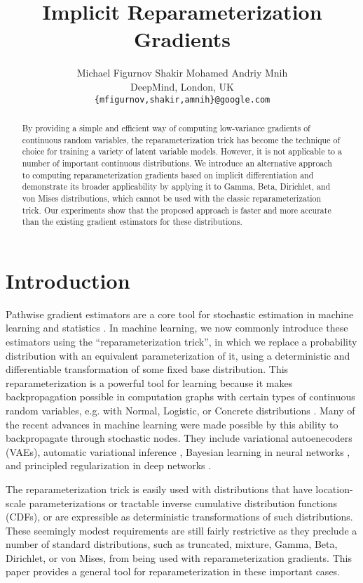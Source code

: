 \documentclass{article}
\title{Implicit Reparameterization Gradients}
\author{
  Michael Figurnov \quad Shakir Mohamed \quad Andriy Mnih\\
  DeepMind, London, UK \\
  \texttt{\{mfigurnov,shakir,amnih\}@google.com}
}
\begin{document}
\maketitle

\begin{abstract}
By providing a simple and efficient way of computing low-variance gradients of continuous random variables, the reparameterization trick has become the technique of choice for training a variety of latent variable models. However, it is not applicable to a number of important continuous distributions.  We introduce an alternative approach to computing reparameterization gradients based on implicit differentiation and demonstrate its broader applicability by applying it to Gamma, Beta, Dirichlet, and von Mises distributions, which cannot be used with the classic reparameterization trick. Our experiments show that the proposed approach is faster and more accurate than the existing gradient estimators for these distributions.
\end{abstract}

\section{Introduction}
Pathwise gradient estimators are a core tool for stochastic estimation in machine learning and statistics \cite{fu2006gradient, glasserman2013monte, titsias2014doubly, kingma2014auto, rezende2014stochastic}. In machine learning, we now commonly introduce these estimators using the ``reparameterization trick'', in which we replace a probability distribution with an equivalent parameterization of it, using a deterministic and differentiable transformation of some fixed base distribution. This reparameterization is a powerful tool for learning because it makes backpropagation possible in computation graphs with certain types of continuous random variables, e.g. with Normal, Logistic, or Concrete distributions \cite{jang2017categorical, maddison2017concrete}. Many of the recent advances in machine learning were made possible by this ability to backpropagate through stochastic nodes. They include variational autoenecoders (VAEs), automatic variational inference \cite{kingma2014auto, rezende2014stochastic, kucukelbir2017automatic}, Bayesian learning in neural networks \cite{blundell2015weight, gal2016dropout}, and principled regularization in deep networks \cite{gal2016theoretically, molchanov2017variational}.

The reparameterization trick is easily used with distributions that have location-scale parameterizations or tractable inverse cumulative distribution functions (CDFs), or are expressible as deterministic transformations of such distributions.
These seemingly modest requirements are still fairly restrictive as they preclude a number of standard distributions, such as truncated, mixture, Gamma, Beta, Dirichlet, or von Mises, from being used with reparameterization gradients. This paper provides a general tool for reparameterization in these important cases.
\end{document}
